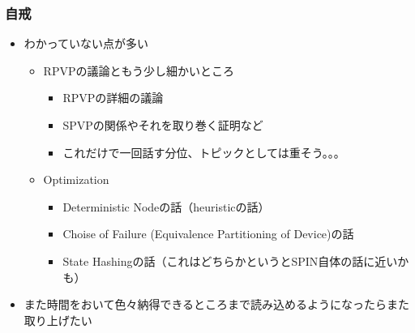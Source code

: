 \documentclass[dvipdfmx,9pt,notheorems]{beamer}
\theoremstyle{definition}
\begin{document}
\begin{frame}\frametitle{自戒}
	\begin{itemize}
		\item わかっていない点が多い
			\begin{itemize}
				\item RPVPの議論ともう少し細かいところ
				\begin{itemize}
					\item RPVPの詳細の議論
					\item SPVPの関係やそれを取り巻く証明など
					\item これだけで一回話す分位、トピックとしては重そう。。。
				\end{itemize}
				\item Optimization
				\begin{itemize}
					\item Deterministic Nodeの話（heuristicの話）
					\item Choise of Failure (Equivalence Partitioning of Device)の話
					\item State Hashingの話（これはどちらかというとSPIN自体の話に近いかも）
				\end{itemize}
			\end{itemize}
		\item また時間をおいて色々納得できるところまで読み込めるようになったらまた取り上げたい
	\end{itemize}
	\pnote{
	}
\end{frame}

\setcounter{finalframe}{\value{framenumber}}
\setcounter{framenumber}{\value{finalframe}}
\end{document}
